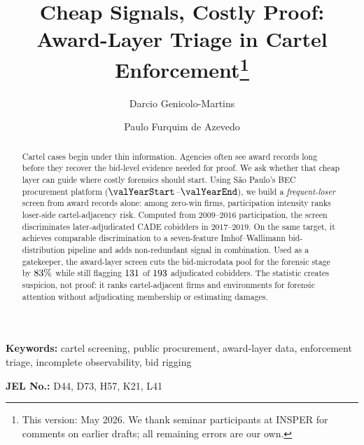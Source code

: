 \begin{frontmatter}

\title{Cheap Signals, Costly Proof: Award-Layer Triage in Cartel Enforcement\texorpdfstring{\footnote{This version: May 2026. We thank seminar participants at INSPER for comments on earlier drafts; all remaining errors are our own.}}{}}

\author[insper]{Darcio Genicolo-Martins}
\author[insper]{Paulo Furquim de Azevedo}

\begin{abstract}
Cartel cases begin under thin information. Agencies often see
award records long before they recover the bid-level evidence
needed for proof. We ask whether that cheap layer can guide where
costly forensics should start. Using São Paulo's BEC procurement
platform ($\valYearStart$--$\valYearEnd$), we build a
\emph{frequent-loser} screen from award records alone: among
zero-win firms, participation intensity ranks loser-side
cartel-adjacency risk. Computed from $2009$--$2016$
participation, the screen discriminates later-adjudicated CADE
cobidders in $2017$--$2019$. On the same target, it achieves
comparable discrimination to a seven-feature Imhof--Wallimann
bid-distribution pipeline and adds non-redundant signal in
combination. Used as a
gatekeeper, the award-layer screen cuts the bid-microdata pool
for the forensic stage by $83\%$ while
still flagging $131$ of $193$
adjudicated cobidders. The statistic creates suspicion, not
proof: it ranks cartel-adjacent firms and environments for
forensic attention without adjudicating membership or estimating
damages.
\end{abstract}

\end{frontmatter}

\noindent\textbf{Keywords:} cartel screening, public procurement, award-layer data, enforcement triage, incomplete observability, bid rigging

\noindent\textbf{JEL No.:} D44, D73, H57, K21, L41

\bigskip
